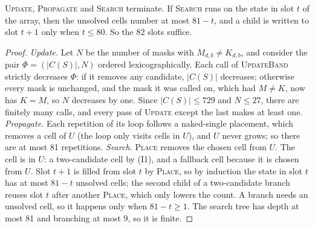 \begin{lemma}
\label{lem:termination}
\textsc{Update}, \textsc{Propagate} and \textsc{Search} terminate. If \textsc{Search} runs on the state in slot $t$ of
the array, then the unsolved cells number at most $81-t$, and a child is written to slot $t+1$ only when $t\le 80$. So
the 82 slots suffice.
\end{lemma}
\begin{proof}
\emph{Update.} Let $N$ be the number of masks with $M_{d,b}\neq K_{d,b}$, and consider the pair
$\Phi=(|C(S)|, N)$ ordered lexicographically. Each call of \textsc{UpdateBand} strictly decreases $\Phi$: if it
removes any candidate, $|C(S)|$ decreases; otherwise every mask is unchanged, and the mask it was called on, which had
$M\neq K$, now has $K=M$, so $N$ decreases by one. Since $|C(S)|\le 729$ and $N\le 27$, there are finitely many calls,
and every pass of \textsc{Update} except the last makes at least one.
\emph{Propagate.} Each repetition of its loop follows a naked-single placement, which removes a cell of $U$ (the loop
only visits cells in $U$), and $U$ never grows; so there are at most 81 repetitions.
\emph{Search.} \textsc{Place} removes the chosen cell from $U$. The cell is in $U$: a two-candidate cell by (I1), and a
fallback cell because it is chosen from $U$. Slot $t+1$ is filled from slot $t$ by \textsc{Place}, so by induction the
state in slot $t$ has at most $81-t$ unsolved cells; the second child of a two-candidate branch reuses slot $t$ after
another \textsc{Place}, which only lowers the count. A branch needs an unsolved cell, so it happens only when
$81-t\ge 1$. The search tree has depth at most 81 and branching at most 9, so it is finite.
\end{proof}

